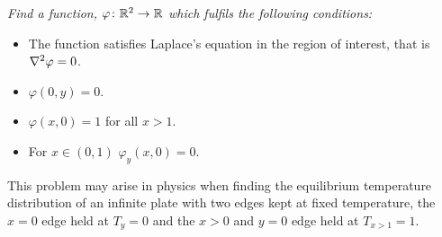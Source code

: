 \documentclass{article}
\begin{document}
    \begin{example}
        \itshape
        Find a function, \(\varphi\colon\mathbb{R}^2 \to \mathbb{R}\) which fulfils the following conditions:
        \begin{itemize}
            \item The function satisfies Laplace's equation in the region of interest, that is \(\nabla^2\varphi = 0\).
            \item \(\varphi(0, y) = 0\).
            \item \(\varphi(x, 0) = 1\) for all \(x > 1\).
            \item For \(x \in (0, 1)\) \(\varphi_y(x, 0) = 0\).
        \end{itemize}
        This problem may arise in physics when finding the equilibrium temperature distribution of an infinite plate with two edges kept at fixed temperature, the \(x = 0\) edge held at \(T_y = 0\) and the \(x > 0\) and \(y = 0\) edge held at \(T_{x>1} = 1\).
        

\end{example}
\end{document}
